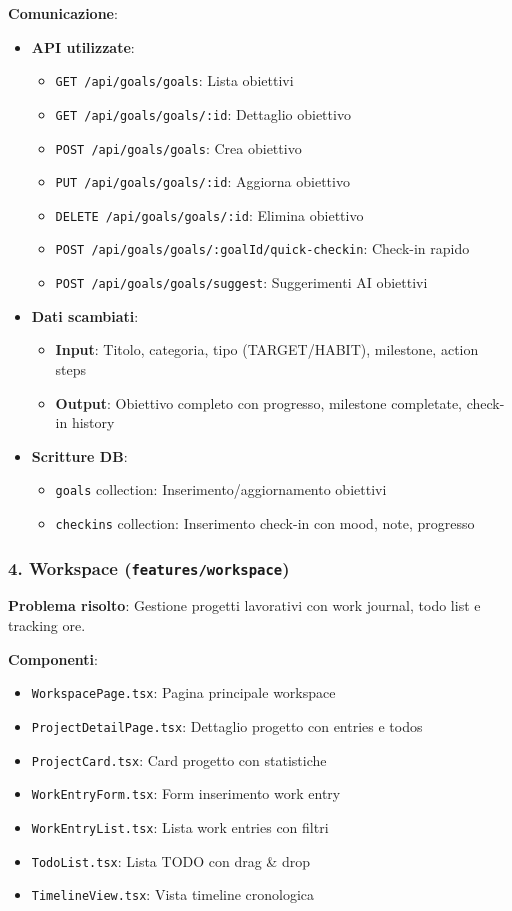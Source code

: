 \documentclass[11pt,a4paper]{article}
\begin{document}
\textbf{Comunicazione}:
\begin{itemize}
    \item \textbf{API utilizzate}: 
    \begin{itemize}
        \item \texttt{GET /api/goals/goals}: Lista obiettivi
        \item \texttt{GET /api/goals/goals/:id}: Dettaglio obiettivo
        \item \texttt{POST /api/goals/goals}: Crea obiettivo
        \item \texttt{PUT /api/goals/goals/:id}: Aggiorna obiettivo
        \item \texttt{DELETE /api/goals/goals/:id}: Elimina obiettivo
        \item \texttt{POST /api/goals/goals/:goalId/quick-checkin}: Check-in rapido
        \item \texttt{POST /api/goals/goals/suggest}: Suggerimenti AI obiettivi
    \end{itemize}
    \item \textbf{Dati scambiati}: 
    \begin{itemize}
        \item \textbf{Input}: Titolo, categoria, tipo (TARGET/HABIT), milestone, action steps
        \item \textbf{Output}: Obiettivo completo con progresso, milestone completate, check-in history
    \end{itemize}
    \item \textbf{Scritture DB}: 
    \begin{itemize}
        \item \texttt{goals} collection: Inserimento/aggiornamento obiettivi
        \item \texttt{checkins} collection: Inserimento check-in con mood, note, progresso
    \end{itemize}
\end{itemize}

\subsubsection{4. Workspace (\texttt{features/workspace})}

\textbf{Problema risolto}: Gestione progetti lavorativi con work journal, todo list e tracking ore.

\textbf{Componenti}:
\begin{itemize}
    \item \texttt{WorkspacePage.tsx}: Pagina principale workspace
    \item \texttt{ProjectDetailPage.tsx}: Dettaglio progetto con entries e todos
    \item \texttt{ProjectCard.tsx}: Card progetto con statistiche
    \item \texttt{WorkEntryForm.tsx}: Form inserimento work entry
    \item \texttt{WorkEntryList.tsx}: Lista work entries con filtri
    \item \texttt{TodoList.tsx}: Lista TODO con drag \& drop
    \item \texttt{TimelineView.tsx}: Vista timeline cronologica
\end{itemize}
\end{document}
